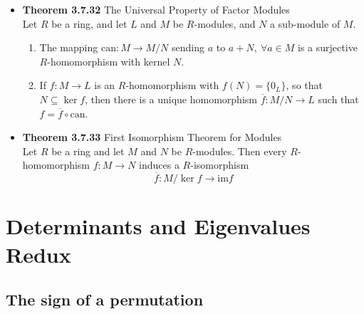 \documentclass[11pt,a4paper]{article}
\begin{document}
\begin{itemize}
    \item \textbf{Theorem 3.7.32} The Universal Property of Factor Modules \\
        Let $R$ be a ring, and let $L$ and $M$ be $R$-modules, and $N$ a sub-module of $M$.
        \begin{enumerate}
            \item The mapping $\mathrm{can} : M \to M/N$ sending $a$ to $a+N, \ \forall a \in M$
                is a surjective $R$-homomorphism with kernel $N$.
            \item If $f : M \to L$ is an $R$-homomorphism with $f(N) = \{0_L\}$,
                so that $N \subseteq \ker f$,
                then there is a unique homomorphism $\overline{f} : M/N \to L$
                such that $f = \overline{f} \circ \mathrm{can}$.
        \end{enumerate}

    \item \textbf{Theorem 3.7.33} First Isomorphism Theorem for Modules \\
        Let $R$ be a ring and let $M$ and $N$ be $R$-modules.
        Then every $R$-homomorphism $f : M \to N$ induces a $R$-isomorphism
        \[
            \overline{f} : M / \ker f \to \mathrm{im} f
        \]
\end{itemize}

\section{Determinants and Eigenvalues Redux}

\subsection{The sign of a permutation}
\end{document}
